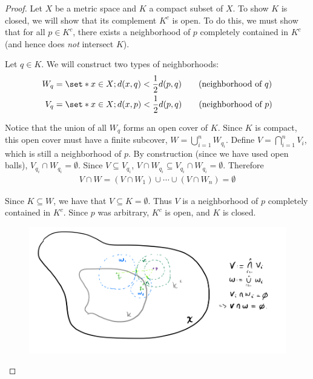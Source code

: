 \documentclass[11pt]{article}
\numberwithin{equation}{section}
\theoremstyle{definition}
\theoremstyle{definition}
\def\Set{\set*}%
\newcommand{\1}{\mathbbm 1}
\begin{document}
\begin{theorem}
\end{theorem}
\begin{proof}
	Let $X$ be a metric space and $K$ a compact subset of $X$. To show $K$ is closed, we will show that its complement $K^c$ is open. To do this, we must show that for all $p \in K^c$, there exists a neighborhood of $p$ completely contained in $K^c$ (and hence does \emph{not} intersect $K$). 

	Let $q \in K$. We will construct two types of neighborhoods:
	\begin{align*}
		W_q &= \Set{x \in X; d(x,q) < \frac{1}{2} d(p,q)} \tag{neighborhood of $q$} \\
		V_q &= \Set{x \in X; d(x,p) < \frac{1}{2} d(p,q)} \tag{neighborhood of $p$}
	\end{align*}
	
	Notice that the union of all $W_q$ forms an open cover of $K$. Since $K$ is compact, this open cover must have a finite subcover, $W = \bigcup_{i=1}^n W_{q_i}$. Define $V = \bigcap_{i=1}^n V_i$, which is still a neighborhood of $p$. By construction (since we have used open balls), $V_{q_i} \cap W_{q_i} = \emptyset$. Since $V \subseteq V_{q_i}$, $V \cap W_{q_i} \subseteq V_{q_i} \cap W_{q_i} = \emptyset$.  Therefore
	\begin{align*}
		V \cap W = (V \cap W_1) \cup \cdots \cup (V \cap W_n) = \emptyset
	\end{align*}
	
	Since $K \subseteq W$, we have that $V \subseteq K = \emptyset$. Thus $V$ is a neighborhood of $p$ completely contained in $K^c$. Since $p$ was arbitrary, $K^c$ is open, and $K$ is closed. 
	
	
	\begin{figure}[H]
		\begin{center}
			\includegraphics[scale=.45]{compact_closed.png}
		\end{center}
	\end{figure}
\end{proof}
\end{document}
